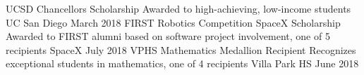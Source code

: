 \documentclass[]{awesome-cv}
\begin{document}
\vspace{-5mm}
\begin{cvhonors}
	\cvhonor
	{UCSD Chancellor\textquotesingle{}s Scholarship}
	{Awarded to high-achieving, low-income students}
	{UC San Diego}
	{March 2018}
	\cvhonor
	{FIRST Robotics Competition SpaceX Scholarship}
	{Awarded to FIRST alumni based on software project involvement, one of 5 recipients}
	{SpaceX}
	{July 2018}
	\cvhonor
	{VPHS Mathematics Medallion Recipient}
	{Recognizes exceptional students in mathematics, one of 4 recipients}
	{Villa Park HS}
	{June 2018}
\end{cvhonors}
\end{document}
